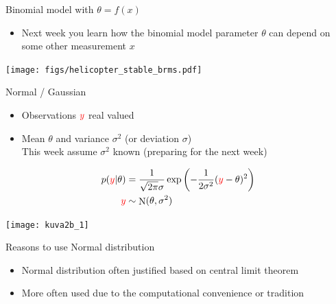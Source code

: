 \documentclass[english,t]{beamer}
\DeclareMathOperator{\N}{N}
\begin{document}
\begin{frame}{Binomial model with $\theta=f(x)$}

  \begin{itemize}
  \item Next week you learn how the binomial model parameter $\theta$
    can depend on some other measurement $x$
  \end{itemize}
  
  \texttt{[image: figs/helicopter\_stable\_brms.pdf]}
  
\end{frame}


\begin{frame}{Normal / Gaussian}

  \begin{itemize}
  \item Observations ${\color{red}y}$ real valued
  \item Mean $\theta$ and variance $\sigma^2$ (or deviation $\sigma$)\\
    This week assume $\sigma^2$ known (preparing for the next week)
  \end{itemize}
  \vskip -2mm
  \begin{align*}
    p({\color{red}y}|\theta)&=\frac{1}{\sqrt{2\pi}\sigma}\exp\left(-\frac{1}{2\sigma^2}({\color{red}y}-\theta)^2\right)\\
    {\color{red}y} & \sim \N(\theta,\sigma^2)
  \end{align*}

  \begin{center}
    \texttt{[image: kuva2b\_1]}
  \end{center}
\end{frame}

\begin{frame}{Reasons to use Normal distribution}

  \begin{itemize}
  \item Normal distribution often justified based on central limit theorem
  \item More often used due to the computational convenience or tradition
  \end{itemize}

\end{frame}

\end{document}
